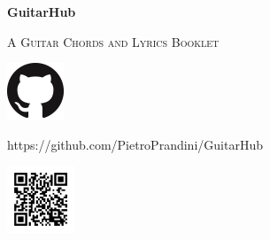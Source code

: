 
\begin{titlepage}
	\begin{center}
		{\sffamily\huge\bfseries GuitarHub\par}
	\end{center}
	\begin{center}
		{\ttfamily\scshape\Large A Guitar Chords and Lyrics Booklet\par}
	\end{center}
	\begin{center}
		\includegraphics[scale=0.3]{img/GitHub-Mark-64px}\\ %
		{\ttfamily\footnotesize https://github.com/PietroPrandini/GuitarHub\par}
		\includegraphics[width=2cm]{img/GuitarHubSiteL}%
	\end{center}
\end{titlepage}
